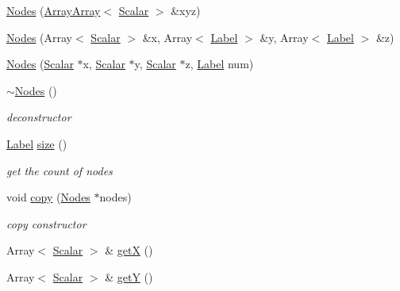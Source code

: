 \begin{DoxyCompactItemize}
\hyperlink{classHSF_1_1Nodes_a6c4e1453888f5fa3008d992d1f19c1b4}{Nodes} (\hyperlink{classHSF_1_1ArrayArray}{ArrayArray}$<$ \hyperlink{namespaceHSF_a7419497552ed1c5631a818b75eed1aec}{Scalar} $>$ \&xyz)
\item 
\hyperlink{classHSF_1_1Nodes_aa08a28dcddd6fdbc64fef3d3c7bfba82}{Nodes} (Array$<$ \hyperlink{namespaceHSF_a7419497552ed1c5631a818b75eed1aec}{Scalar} $>$ \&x, Array$<$ \hyperlink{namespaceHSF_ae65d72be782e989396ebe5ec6ae4c2b6}{Label} $>$ \&y, Array$<$ \hyperlink{namespaceHSF_ae65d72be782e989396ebe5ec6ae4c2b6}{Label} $>$ \&z)
\item 
\hyperlink{classHSF_1_1Nodes_a545e2813acfe02611c3ef8d659c8ce2f}{Nodes} (\hyperlink{namespaceHSF_a7419497552ed1c5631a818b75eed1aec}{Scalar} $\ast$x, \hyperlink{namespaceHSF_a7419497552ed1c5631a818b75eed1aec}{Scalar} $\ast$y, \hyperlink{namespaceHSF_a7419497552ed1c5631a818b75eed1aec}{Scalar} $\ast$z, \hyperlink{namespaceHSF_ae65d72be782e989396ebe5ec6ae4c2b6}{Label} num)
\item 
\hyperlink{classHSF_1_1Nodes_aad6cecbfe88532697dedfca221638d89}{$\sim$Nodes} ()
\begin{DoxyCompactList}\small\item\em deconstructor \item\end{DoxyCompactList}\item 
\hyperlink{namespaceHSF_ae65d72be782e989396ebe5ec6ae4c2b6}{Label} \hyperlink{classHSF_1_1Nodes_a8e3420be01fedbc5682e037631c28465}{size} ()
\begin{DoxyCompactList}\small\item\em get the count of nodes \item\end{DoxyCompactList}\item 
void \hyperlink{classHSF_1_1Nodes_a77f909942d5128a6cf8bb7fe6348a26d}{copy} (\hyperlink{classHSF_1_1Nodes}{Nodes} $\ast$nodes)
\begin{DoxyCompactList}\small\item\em copy constructor \item\end{DoxyCompactList}\item 
Array$<$ \hyperlink{namespaceHSF_a7419497552ed1c5631a818b75eed1aec}{Scalar} $>$ \& \hyperlink{classHSF_1_1Nodes_a7bd1a1a78aab473faef1ebacacf9f731}{getX} ()
\item 
Array$<$ \hyperlink{namespaceHSF_a7419497552ed1c5631a818b75eed1aec}{Scalar} $>$ \& \hyperlink{classHSF_1_1Nodes_a4812ccaf862af8b114903ca9adf68ded}{getY} ()

\end{DoxyCompactItemize}
